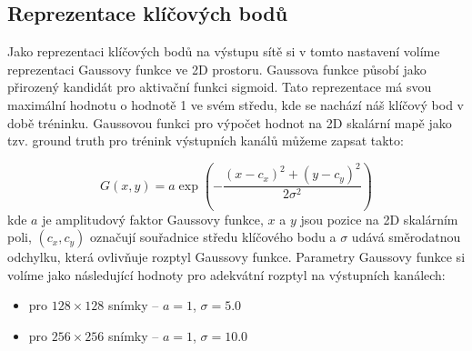 \subsection{Reprezentace klíčových bodů}

Jako reprezentaci klíčových bodů na výstupu sítě si v tomto nastavení volíme reprezentaci Gaussovy funkce ve 2D prostoru. Gaussova funkce působí jako přirozený kandidát pro aktivační funkci sigmoid. Tato reprezentace má svou maximální hodnotu o hodnotě 1 ve svém středu, kde se nachází náš klíčový bod v době tréninku. Gaussovou funkci pro výpočet hodnot na 2D skalární mapě jako tzv. ground truth pro trénink výstupních kanálů můžeme zapsat takto:

\begin{equation}
    G(x, y) = a \exp\left(-\frac{(x - c_x)^2 + (y - c_y)^2}{2\sigma^2}\right)
\end{equation}
kde $a$ je amplitudový faktor Gaussovy funkce, $x$ a $y$ jsou pozice na 2D skalárním poli, $(c_x, c_y)$ označují souřadnice středu klíčového bodu a $\sigma$ udává směrodatnou odchylku, která ovlivňuje rozptyl Gaussovy funkce. Parametry Gaussovy funkce si volíme jako následující hodnoty pro adekvátní rozptyl na výstupních kanálech: 
\begin{itemize}
    \item pro $128 \times 128$ snímky -- $a=1$, $\sigma=5.0$
    \item pro $256 \times 256$ snímky -- $a=1$, $\sigma=10.0$
\end{itemize}

